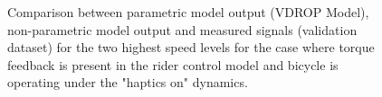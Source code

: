  \begin{figure}
    \centering
    \begin{subfigure}[b]{\textwidth}
        \centering
        \caption{}
        \label{fig:ropm_val3}
    \end{subfigure}
    \begin{subfigure}[b]{\textwidth}
        \centering
        \caption{}
        \label{fig:ropm_val4}
    \end{subfigure}
    
    \caption{Comparison between parametric model output (VDROP Model), non-parametric model output and  measured signals (validation dataset)   for the two highest speed levels for the case where torque feedback is present in the rider control model and bicycle is operating under the "haptics on" dynamics.}
    \label{fig:ropm_valB}
 \end{figure}
